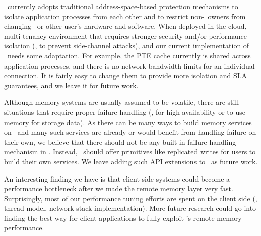 \documentclass[10pt,times,twocolumn]{article}
\begin{document}
\begin{appendices}

\sys\ currently adopts traditional address-space-based protection mechanisms to 
isolate application processes from each other 
and to restrict non-\sys\ owners from changing \sys\ or other user's hardware and software.
When deployed in the cloud, multi-tenancy environment that requires stronger security and/or performance isolation (\eg, to prevent side-channel attacks),
and our current implementation of \sys\ needs some adaptation. %
For example, the PTE cache currently is shared across application processes,
and there is no network bandwidth limits for an individual connection.
It is fairly easy to change them to provide more isolation and SLA guarantees,
and we leave it for future work. %

Although memory systems are usually assumed to be volatile, %
there are still situations that require proper failure handling (\eg, for high availability or to use memory for storage data).
As there can be many ways to build memory services on \sys\ 
and many such services are already or would benefit from handling failure on their own,
we believe that there should not be any built-in failure handling mechanism in \sys.
Instead, \sys\ should offer primitives like replicated writes for users to build their own services.
We leave adding such API extensions to \sys\ as future work.

An interesting finding we have is that client-side systems
could become a performance bottleneck after we made the remote memory layer very fast.
Surprisingly, most of our performance tuning efforts are spent on the client side (\eg, thread model, network stack implementation).
More future research could go into finding the best way for client applications to fully exploit \sys's remote memory performance.




\end{appendices}
\end{document}
